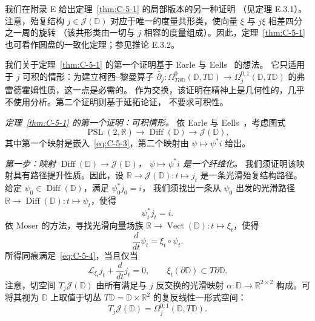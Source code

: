 \begin{remark}\label{rem:C-5-6}
我们在附录 E 给出定理~\ref{thm:C-5-1} 的局部版本的另一种证明
（见定理 E.3.1）。注意，殆复结构 $j\in\mathcal J(\mathbb D)$
对应于唯一的度量共形类，使向量 $\xi$ 与 $j\xi$ 相差四分之一周的旋转
（该共形类由一切与 $j$ 相容的度量组成）。因此，定理~\ref{thm:C-5-1}
也可看作圆盘的一致化定理；参见推论 E.3.2。
\end{remark}

我们关于定理~\ref{thm:C-5-1} 的第一个证明基于 Earle 与 Eells~ 的想法。
它只适用于 $j$ 可积的情形：为建立柯西--黎曼算子
$\bar\partial_j:\Omega^0_{T\partial\mathbb D}(\mathbb D,T\mathbb D)
\to\Omega^{0,1}_j(\mathbb D,T\mathbb D)$ 的弗雷德霍姆性质，这一点是必需的。
作为交换，该证明在精神上是几何性的，几乎不使用分析。第二个证明则基于延拓论证，
不要求可积性。

\emph{定理~\ref{thm:C-5-1} 的第一个证明：可积情形。}
依 Earle 与 Eells~，考虑图式
\[
  \operatorname{PSL}(2,\mathbb R)
  \longrightarrow\operatorname{Diff}(\mathbb D)
  \longrightarrow\mathcal J(\mathbb D),
\]
其中第一个映射是嵌入~\eqref{eq:C-5-3}，第二个映射由
$\psi\mapsto\psi^*i$ 给出。

\emph{第一步：映射 $\operatorname{Diff}(\mathbb D)\to\mathcal J(\mathbb D)$，
$\psi\mapsto\psi^*i$ 是一个纤维化。}
我们须证明该映射具有路径提升性质。因此，设
$\mathbb R\to\mathcal J(\mathbb D):t\mapsto j_t$ 是一条光滑殆复结构路径。
给定 $\psi_0\in\operatorname{Diff}(\mathbb D)$，满足 $\psi_0^*j_0=i$，
我们须找出一条从 $\psi_0$ 出发的光滑路径
$\mathbb R\to\operatorname{Diff}(\mathbb D):t\mapsto\psi_t$，使得
\begin{equation}\label{eq:C-5-4}
  \psi_t^*j_t=i.
\end{equation}
依 Moser 的方法，寻找光滑向量场族
$\mathbb R\to\operatorname{Vect}(\mathbb D):t\mapsto\xi_t$，使得
\begin{equation}\label{eq:C-5-5}
  \frac{d}{dt}\psi_t=\xi_t\circ\psi_t.
\end{equation}
所得同痕满足~\eqref{eq:C-5-4}，当且仅当
\begin{equation}\label{eq:C-5-6}
  \mathcal L_{\xi_t}j_t+\frac{d}{dt}j_t=0,
  \qquad \xi_t(\partial\mathbb D)\subset T\partial\mathbb D.
\end{equation}
注意，切空间 $T_j\mathcal J(\mathbb D)$ 由所有满足与 $j$ 反交换的光滑映射
$\alpha:\mathbb D\to\mathbb R^{2\times2}$ 构成。可将其视为
$\mathbb D$ 上取值于切丛 $T\mathbb D=\mathbb D\times\mathbb R^2$ 的复反线性一形式空间：
\[
  T_j\mathcal J(\mathbb D)=\Omega^{0,1}_j(\mathbb D,T\mathbb D).
\]

